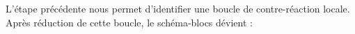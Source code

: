 \begin{center}
\end{center}                                                                               
L'étape précédente nous permet d'identifier une boucle de contre-réaction locale.
Après réduction de cette boucle, le schéma-blocs dévient :
